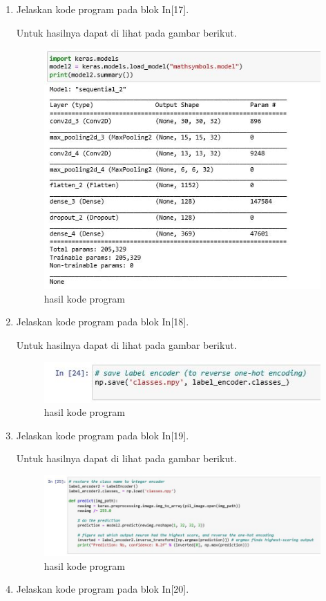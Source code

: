 \begin{enumerate}
\item Jelaskan kode program pada blok In[17].

Untuk hasilnya dapat di lihat pada gambar berikut.
\begin{figure}[ht]
\centering
\includegraphics[scale=0.4]{figures/1174002/chapter7/2,17.JPG}
\caption{hasil kode program}
\label{Contoh}
\end{figure}

\item Jelaskan kode program pada blok In[18].

Untuk hasilnya dapat di lihat pada gambar berikut.
\begin{figure}[ht]
\centering
\includegraphics[scale=0.4]{figures/1174002/chapter7/2,18.JPG}
\caption{hasil kode program}
\label{Contoh}
\end{figure}

\item Jelaskan kode program pada blok In[19].

Untuk hasilnya dapat di lihat pada gambar berikut.
\begin{figure}[ht]
\centering
\includegraphics[scale=0.4]{figures/1174002/chapter7/2,19.JPG}
\caption{hasil kode program}
\label{Contoh}
\end{figure}

\item Jelaskan kode program pada blok In[20].

\end{enumerate}


